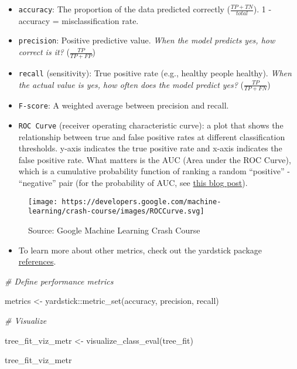 \documentclass[
]{book}
\newenvironment{Shaded}{\begin{snugshade}}{\end{snugshade}}
\newcommand{\CommentTok}[1]{\textcolor[rgb]{0.56,0.35,0.01}{\textit{#1}}}
\newcommand{\FunctionTok}[1]{\textcolor[rgb]{0.00,0.00,0.00}{#1}}
\newcommand{\NormalTok}[1]{#1}
\newcommand{\OtherTok}[1]{\textcolor[rgb]{0.56,0.35,0.01}{#1}}
\newcommand{\SpecialCharTok}[1]{\textcolor[rgb]{0.00,0.00,0.00}{#1}}
\providecommand{\tightlist}{%
  \setlength{\itemsep}{0pt}\setlength{\parskip}{0pt}}
\begin{document}
\begin{itemize}
\item
  \texttt{accuracy}: The proportion of the data predicted correctly (\(\frac{TP + TN}{total}\)). 1 - accuracy = misclassification rate.
\item
  \texttt{precision}: Positive predictive value. \emph{When the model predicts yes, how correct is it?} (\(\frac{TP}{TP + FP}\))
\item
  \texttt{recall} (sensitivity): True positive rate (e.g., healthy people healthy). \emph{When the actual value is yes, how often does the model predict yes?} (\(\frac{TP}{TP + FN}\))
\item
  \texttt{F-score}: A weighted average between precision and recall.
\item
  \texttt{ROC\ Curve} (receiver operating characteristic curve): a plot that shows the relationship between true and false positive rates at different classification thresholds. y-axis indicates the true positive rate and x-axis indicates the false positive rate. What matters is the AUC (Area under the ROC Curve), which is a cumulative probability function of ranking a random ``positive'' - ``negative'' pair (for the probability of AUC, see \href{https://www.alexejgossmann.com/auc/}{this blog post}).
\end{itemize}

\begin{figure}
\centering
\texttt{[image: https://developers.google.com/machine-learning/crash-course/images/ROCCurve.svg]}
\caption{Source: Google Machine Learning Crash Course}
\end{figure}

\begin{itemize}
\tightlist
\item
  To learn more about other metrics, check out the yardstick package \href{https://yardstick.tidymodels.org/reference/index.html}{references}.
\end{itemize}

\begin{Shaded}
\begin{Highlighting}[]
\CommentTok{\# Define performance metrics}

\NormalTok{metrics }\OtherTok{\textless{}{-}}\NormalTok{ yardstick}\SpecialCharTok{::}\FunctionTok{metric\_set}\NormalTok{(accuracy, precision, recall)}

\CommentTok{\# Visualize}

\NormalTok{tree\_fit\_viz\_metr }\OtherTok{\textless{}{-}} \FunctionTok{visualize\_class\_eval}\NormalTok{(tree\_fit)}

\NormalTok{tree\_fit\_viz\_metr}
\end{Highlighting}
\end{Shaded}
\end{document}
